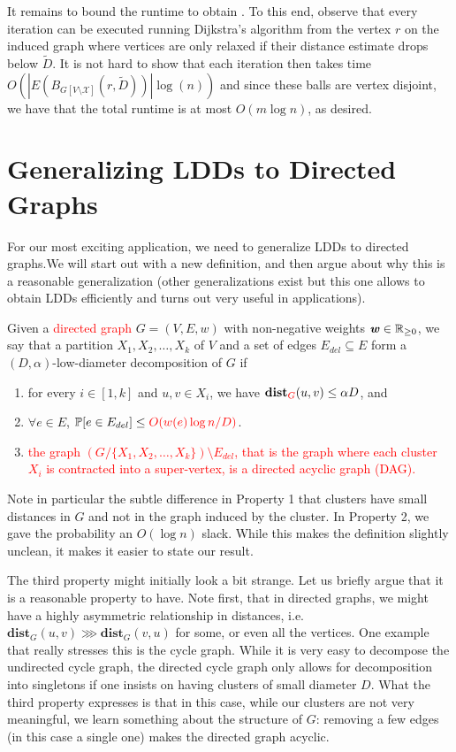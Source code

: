 It remains to bound the runtime to obtain . To this end, observe that every iteration can be executed running Dijkstra's algorithm from the vertex $r$ on the induced graph where vertices are only relaxed if their distance estimate drops below $\tilde{D}$. It is not hard to show that each iteration then takes time $O(|E(B_{G[V \setminus \mathcal{X}]}(r, \tilde{D}))| \log(n))$ and since these balls are vertex disjoint, we have that the total runtime is at most $O(m\log n)$, as desired.

\section{Generalizing LDDs to Directed Graphs}

For our most exciting application, we need to generalize LDDs to directed graphs.We will start out with a new definition, and then argue about why this is a reasonable generalization (other generalizations exist but this one allows to obtain LDDs efficiently and turns out very useful in applications).

\begin{definition}
Given a \textcolor{red}{directed graph} $G = (V,E,w)$ with non-negative weights $\boldsymbol{\mathit{w}} \in \mathbb{R}_{\geq 0}$, we say that a partition $X_1, X_2, \ldots, X_k$ of $V$ and a set of edges $E_{del} \subseteq E$ form a $(D, \alpha)$-low-diameter decomposition of $G$ if
\begin{enumerate}
\item for every $i \in [1, k]$ and $u,v \in X_i$, we have $\mathbf{dist}_{\textcolor{red}{G}}(u,v) \leq \alpha D$, and
\item $\forall e \in E$, $\mathbb{P}[e \in E_{del}] \leq \textcolor{red}{O(w(e) \log n/ D)}$.
\item \textcolor{red}{the graph $(G / \{X_1, X_2, \ldots, X_k\}) \setminus E_{del}$, that is the graph where each cluster $X_i$ is contracted into a super-vertex, is a directed acyclic graph (DAG).}
\end{enumerate}
\end{definition}

Note in particular the subtle difference in Property 1 that clusters have small distances in $G$ and not in the graph induced by the cluster. In Property 2, we gave the probability an $O(\log n)$ slack. While this makes the definition slightly unclean, it makes it easier to state our result.

The third property might initially look a bit strange. Let us briefly argue that it is a reasonable property to have. Note first, that in directed graphs, we might have a highly asymmetric relationship in distances, i.e. $\mathbf{dist}_G(u,v) \ggg \mathbf{dist}_G(v,u)$ for some, or even all the vertices. One example that really stresses this is the cycle graph. While it is very easy to decompose the undirected cycle graph, the directed cycle graph only allows for decomposition into singletons if one insists on having clusters of small diameter $D$. What the third property expresses is that in this case, while our clusters are not very meaningful, we learn something about the structure of $G$: removing a few edges (in this case a single one) makes the directed graph acyclic. 

